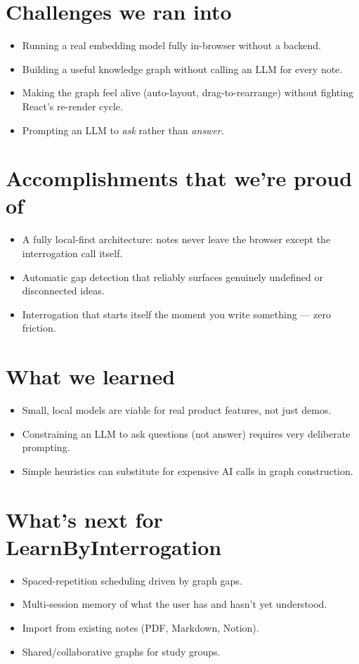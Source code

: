 \documentclass[11pt]{article}
\begin{document}
\section*{Challenges we ran into}
\begin{itemize}
  \item Running a real embedding model fully in-browser without a backend.
  \item Building a useful knowledge graph without calling an LLM for every note.
  \item Making the graph feel alive (auto-layout, drag-to-rearrange) without fighting React's re-render cycle.
  \item Prompting an LLM to \emph{ask} rather than \emph{answer}.
\end{itemize}

\section*{Accomplishments that we're proud of}
\begin{itemize}
  \item A fully local-first architecture: notes never leave the browser except the interrogation call itself.
  \item Automatic gap detection that reliably surfaces genuinely undefined or disconnected ideas.
  \item Interrogation that starts itself the moment you write something — zero friction.
\end{itemize}

\section*{What we learned}
\begin{itemize}
  \item Small, local models are viable for real product features, not just demos.
  \item Constraining an LLM to ask questions (not answer) requires very deliberate prompting.
  \item Simple heuristics can substitute for expensive AI calls in graph construction.
\end{itemize}

\section*{What's next for LearnByInterrogation}
\begin{itemize}
  \item Spaced-repetition scheduling driven by graph gaps.
  \item Multi-session memory of what the user has and hasn't yet understood.
  \item Import from existing notes (PDF, Markdown, Notion).
  \item Shared/collaborative graphs for study groups.
\end{itemize}
\end{document}
